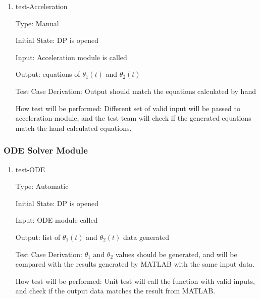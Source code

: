\documentclass[12pt, titlepage]{article}
\begin{document}
\begin{enumerate}

\item{test-Acceleration\\}

Type: Manual
          
Initial State: DP is opened
          
Input: Acceleration module is called
          
Output: equations of $\theta_1(t)$ and $\theta_2(t)$ 

Test Case Derivation: Output should match the equations calculated by hand 

How test will be performed: Different set of valid input will be passed to acceleration module, and the test team will check if the generated equations match the hand calculated equations. 
          
\end{enumerate}


\subsubsection{ODE Solver Module}\label{test_ODE}
\begin{enumerate}

\item{test-ODE\\}

Type: Automatic
          
Initial State: DP is opened
          
Input: ODE module called
          
Output: list of $\theta_1(t)$ and $\theta_2(t)$ data generated

Test Case Derivation: $\theta_1$ and $\theta_2$ values should be generated, and will be compared with the results generated by MATLAB with the same input data.   

How test will be performed: Unit test will call the function with valid inputs, and check if the output data matches the result from MATLAB.
          
\end{enumerate}
\end{document}
